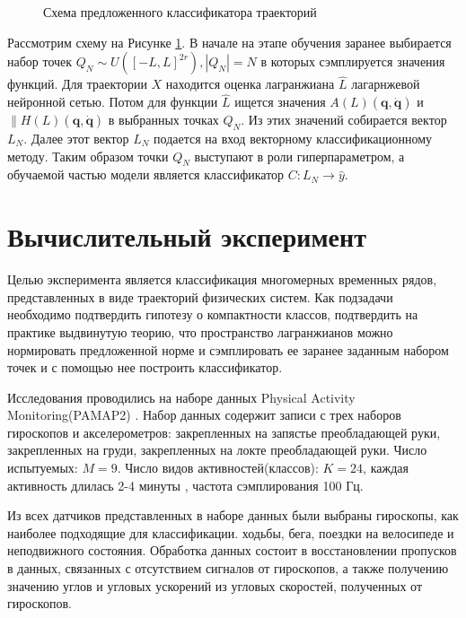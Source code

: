 \documentclass[a4paper, 12pt]{article}
\begin{document}
\begin{figure}[!htbp]
\centering
{}
\caption{Схема предложенного классификатора траекторий}
\label{fig: classificator}
\end{figure}

Рассмотрим схему на Рисунке \ref{fig: classificator}. В начале на этапе обучения заранее выбирается набор точек $Q_N \sim U([-L, L]^{2r}), |Q_N| = N$ в которых сэмплируется значения функций. Для траектории $X$ находится оценка лагранжиана $\hat{L}$ лагарнжевой нейронной сетью. Потом для функции $\hat{L}$ ищется значения $A(L)\left(\mathbf{q}, \dot{\mathbf{q}}\right)$ и $\|H(L)\left(\mathbf{q}, \dot{\mathbf{q}}\right)$ в выбранных точках $Q_N$. Из этих значений собирается вектор $L_N$. Далее этот вектор $L_N$ подается на вход векторному классификационному методу. Таким образом точки  $Q_N$ выступают в роли гиперпараметром, а обучаемой частью модели является классификатор $C: L_N \to \hat{y}$.

\section{Вычислительный эксперимент}
 Целью эксперимента является классификация многомерных временных рядов, представленных в виде траекторий физических систем. Как подзадачи необходимо подтвердить гипотезу о компактности классов, подтвердить на практике выдвинутую теорию, что пространство лагранжианов можно нормировать предложенной норме и сэмплировать ее заранее заданным набором точек и с помощью нее построить классификатор.

    Исследования проводились на наборе данных Physical Activity Monitoring(PAMAP2) \cite{misc_pamap2_physical_activity_monitoring_231}.
 Набор данных содержит записи с трех наборов гироскопов и акселерометров: закрепленных на запястье преобладающей руки, закрепленных на груди, закрепленных на локте преобладающей руки. Число испытуемых: $M = 9$. Число видов активностей(классов): $K = 24$, каждая активность длилась 2-4 минуты \cite{misc_pamap2_physical_activity_monitoring_231}, частота сэмплирования 100 Гц.


 Из всех датчиков представленных в наборе данных были выбраны гироскопы, как наиболее подходящие для классификации. ходьбы, бега, поездки на велосипеде и неподвижного состояния. Обработка данных состоит в восстановлении пропусков в данных, связанных с отсутствием сигналов от гироскопов, а также получению значению углов и угловых ускорений из угловых скоростей, полученных от гироскопов.
 
\end{document}
